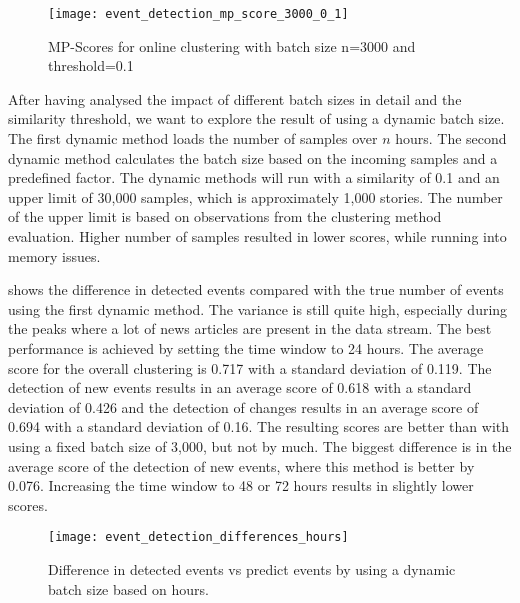 \begin{figure}[h]
    \centering
    \texttt{[image: event\_detection\_mp\_score\_3000\_0\_1]}
    \caption{MP-Scores for online clustering with batch size n=3000 and threshold=0.1}
    \label{fig:event_detection_mp_score_3000_0_1}
\end{figure}

After having analysed the impact of different batch sizes in detail and the similarity threshold,
we want to explore the result of using a dynamic batch size.
The first dynamic method loads the number of samples over $n$ hours.
The second dynamic method calculates the batch size based on the incoming samples and a predefined factor.
The dynamic methods will run with a similarity of 0.1 and an upper limit of 30,000 samples,
which is approximately 1,000 stories.
The number of the upper limit is based on observations from the clustering method evaluation.
Higher number of samples resulted in lower scores, while running into memory issues.

 shows the difference in detected events
compared with the true number of events using the first dynamic method.
The variance is still quite high, especially during the peaks
where a lot of news articles are present in the data stream.
The best performance is achieved by setting the time window to 24 hours.
The average score for the overall clustering is 0.717 with a standard deviation of 0.119.
The detection of new events results in an average score of 0.618 with a standard deviation of 0.426
and the detection of changes results in an average score of 0.694 with a standard deviation of 0.16.
The resulting scores are better than with using a fixed batch size of 3,000, but not by much.
The biggest difference is in the average score of the detection of new events,
where this method is better by 0.076.
Increasing the time window to 48 or 72 hours results in slightly lower scores.

\begin{figure}[h]
    \centering
    \texttt{[image: event\_detection\_differences\_hours]}
    \caption{Difference in detected events vs predict events by using a dynamic batch size based on hours.}
    \label{fig:event_detection_differences_hours}
\end{figure}

